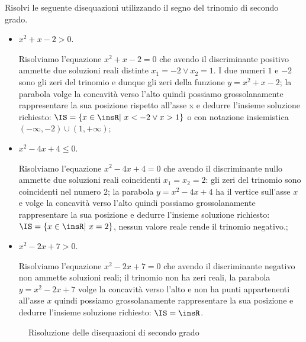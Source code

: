 \begin{exrig}
\begin{esempio}
Risolvi le seguente disequazioni utilizzando il segno del trinomio di secondo grado.
\begin{itemize}
\item $x^2+x-2>0$.

Risolviamo l’equazione $x^2+x-2=0$ che avendo il discriminante positivo ammette due soluzioni reali distinte $x_1=-2\vee x_2=1$. I due numeri $1$ e $-2$ sono gli zeri del trinomio e dunque gli zeri della funzione $y=x^2+x-2$; la parabola volge la concavità verso l’alto quindi possiamo grossolanamente rappresentare la sua posizione rispetto all’asse x e dedurre l’insieme soluzione richiesto: $\IS=\{x\in \insR\text{{\textbar} }x<-2\vee x>1\}$ o con notazione insiemistica $(-\infty,-2)\cup (1,+\infty )$;
\item $x^2-4x+4\le 0$.

Risolviamo l’equazione $x^2-4x+4=0$ che avendo il discriminante nullo ammette due soluzioni reali coincidenti $x_1=x_2=2$: gli zeri del trinomio sono coincidenti nel numero $2$; la parabola $y=x^2-4x+4$ ha il vertice sull’asse $x$ e volge la concavità verso l’alto quindi possiamo grossolanamente rappresentare la sua posizione e dedurre l’insieme soluzione richiesto: $\IS=\{x\in \insR\text{{\textbar} }x=2\}$, nessun valore reale rende il trinomio negativo.;
\item $x^2-2x+7>0$.

Risolviamo l’equazione $x^2-2x+7=0$ che avendo il discriminante negativo non ammette soluzioni reali; il trinomio non ha zeri reali, la parabola $y=x^2-2x+7$ volge la concavità verso l’alto e non ha punti appartenenti all’asse $x$ quindi possiamo grossolanamente rappresentare la sua posizione e dedurre l’insieme soluzione richiesto: $\IS=\insR$.
\end{itemize}
\begin{center}
 
\end{center}
\end{esempio}
\end{exrig}
\vspazio\ovalbox{\risolvii \ref{ese:4.9}, \ref{ese:4.10}, \ref{ese:4.11}, \ref{ese:4.12}, \ref{ese:4.13}, \ref{ese:4.14}, \ref{ese:4.15}, \ref{ese:4.16}, \ref{ese:4.17}, \ref{ese:4.18}, \ref{ese:4.19}, \ref{ese:4.20}, \ref{ese:4.21},}

\vspazio\ovalbox{ \ref{ese:4.22}, \ref{ese:4.23}, \ref{ese:4.24}, \ref{ese:4.25}, \ref{ese:4.26}}

\begin{figure}[tp]
\centering

\vspace{12pt}
{}
\vspace{12pt}
{}
\vspace{12pt}
{}
\vspace{12pt}
{}
\vspace{12pt}
{}
\caption{Risoluzione delle disequazioni di secondo grado}
\label{fig:subfig10}
\end{figure}

